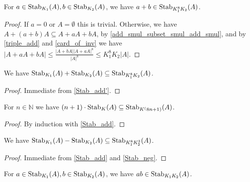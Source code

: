 \begin{lemma}
    \label{Stab_add'}
    \leanok
    For $a \in \operatorname{\operatorname{Stab}}_{K_1}(A), b \in \operatorname{\operatorname{Stab}}_{K_2}(A)$, we have $a+b \in \operatorname{\operatorname{Stab}}_{K_1^8 K_2}(A)$.
\end{lemma}

\begin{proof}
    \leanok
    If $a = 0$ or $A = \emptyset$ this is trivial. Otherwise, we have $A + (a+b) A \subseteq A + a A + b A$, by \ref{add_smul_subset_smul_add_smul},
    and by \ref{triple_add} and \ref{card_of_inv} we have $|A + a A + b A| \leq \frac{|A + bA| |A + aA|^8} {|A|^8} \leq K_1^8 K_2 |A|$.
\end{proof}

\begin{lemma}
    \label{Stab_add}
    \leanok
    We have $\operatorname{\operatorname{Stab}}_{K_1}(A) + \operatorname{\operatorname{Stab}}_{K_2}(A) \subseteq \operatorname{\operatorname{Stab}}_{K_1^8 K_2}(A)$.
\end{lemma}

\begin{proof}
    \leanok
    Immediate from \ref{Stab_add'}.
\end{proof}

\begin{lemma}
    \label{Stab_nsmul}
    \leanok
    For $n \in \mathbb{N}$ we have $(n+1) \cdot \operatorname{\operatorname{Stab}}_{K}(A) \subseteq \operatorname{\operatorname{Stab}}_{K^(8n + 1)}(A)$.
\end{lemma}

\begin{proof}
    \leanok
    By induction with \ref{Stab_add}.
\end{proof}

\begin{lemma}
    \label{Stab_sub}
    \leanok
    We have $\operatorname{\operatorname{Stab}}_{K_1}(A) - \operatorname{\operatorname{Stab}}_{K_2}(A) \subseteq \operatorname{\operatorname{Stab}}_{K_1^8 K_2^3}(A)$.
\end{lemma}

\begin{proof}
    \leanok
    Immediate from \ref{Stab_add} and \ref{Stab_neg}.
\end{proof}

\begin{lemma}
    \label{Stab_mul'}
    \leanok
    For $a \in \operatorname{\operatorname{Stab}}_{K_1}(A), b \in \operatorname{\operatorname{Stab}}_{K_2}(A)$, we have $ab \in \operatorname{\operatorname{Stab}}_{K_1 K_2}(A)$.
\end{lemma}

